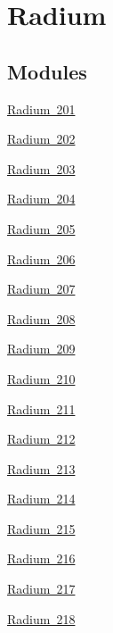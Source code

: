 \hypertarget{group___isotope_const-_radium}{}\section{Radium}
\label{group___isotope_const-_radium}
\subsection*{Modules}
\begin{DoxyCompactItemize}
\item 
\mbox{\hyperlink{group___isotope_const-_radium-_ra201}{Radium 201}}
\item 
\mbox{\hyperlink{group___isotope_const-_radium-_ra202}{Radium 202}}
\item 
\mbox{\hyperlink{group___isotope_const-_radium-_ra203}{Radium 203}}
\item 
\mbox{\hyperlink{group___isotope_const-_radium-_ra204}{Radium 204}}
\item 
\mbox{\hyperlink{group___isotope_const-_radium-_ra205}{Radium 205}}
\item 
\mbox{\hyperlink{group___isotope_const-_radium-_ra206}{Radium 206}}
\item 
\mbox{\hyperlink{group___isotope_const-_radium-_ra207}{Radium 207}}
\item 
\mbox{\hyperlink{group___isotope_const-_radium-_ra208}{Radium 208}}
\item 
\mbox{\hyperlink{group___isotope_const-_radium-_ra209}{Radium 209}}
\item 
\mbox{\hyperlink{group___isotope_const-_radium-_ra210}{Radium 210}}
\item 
\mbox{\hyperlink{group___isotope_const-_radium-_ra211}{Radium 211}}
\item 
\mbox{\hyperlink{group___isotope_const-_radium-_ra212}{Radium 212}}
\item 
\mbox{\hyperlink{group___isotope_const-_radium-_ra213}{Radium 213}}
\item 
\mbox{\hyperlink{group___isotope_const-_radium-_ra214}{Radium 214}}
\item 
\mbox{\hyperlink{group___isotope_const-_radium-_ra215}{Radium 215}}
\item 
\mbox{\hyperlink{group___isotope_const-_radium-_ra216}{Radium 216}}
\item 
\mbox{\hyperlink{group___isotope_const-_radium-_ra217}{Radium 217}}
\item 
\mbox{\hyperlink{group___isotope_const-_radium-_ra218}{Radium 218}}

\end{DoxyCompactItemize}
